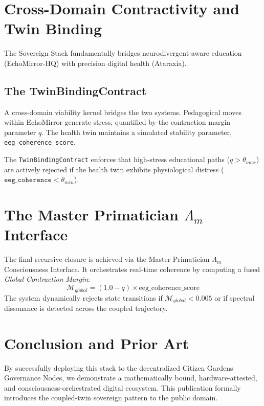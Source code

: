 \documentclass[11pt,a4paper]{article}
\begin{document}
\section{Cross-Domain Contractivity and Twin Binding}
The Sovereign Stack fundamentally bridges neurodivergent-aware education (EchoMirror-HQ) with precision digital health (Ataraxia).
\subsection{The TwinBindingContract}
A cross-domain viability kernel bridges the two systems. Pedagogical moves within EchoMirror generate stress, quantified by the contraction margin parameter $q$. The health twin maintains a simulated stability parameter, \texttt{eeg\_coherence\_score}. 

The \texttt{TwinBindingContract} enforces that high-stress educational paths ($q > \theta_{max}$) are actively rejected if the health twin exhibits physiological distress ($\texttt{eeg\_coherence} < \theta_{min}$).

\section{The Master Primatician $\Lambda_m$ Interface}
The final recursive closure is achieved via the Master Primatician $\Lambda_m$ Consciousness Interface. It orchestrates real-time coherence by computing a fused \textit{Global Contraction Margin}:
\begin{equation}
    \mathcal{M}_{global} = (1.0 - q) \times \text{eeg\_coherence\_score}
\end{equation}
The system dynamically rejects state transitions if $\mathcal{M}_{global} < 0.005$ or if spectral dissonance is detected across the coupled trajectory.

\section{Conclusion and Prior Art}
By successfully deploying this stack to the decentralized Citizen Gardens Governance Nodes, we demonstrate a mathematically bound, hardware-attested, and consciousness-orchestrated digital ecosystem. This publication formally introduces the coupled-twin sovereign pattern to the public domain.
\end{document}

